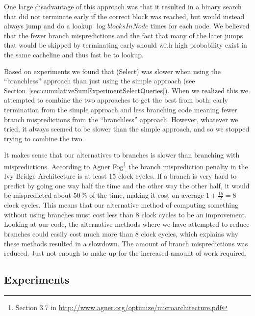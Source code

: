 One large disadvantage of this approach was that it resulted in a binary search that did not terminate early if the correct block was reached, but would instead always jump and do a lookup $\log \mathit{blocksInNode}$ times for each node.
We believed that the fewer branch mispredictions and the fact that many of the later jumps that would be skipped by terminating early should with high probability exist in the same cacheline and thus fast be to lookup.

Based on experiments we found that \textproc(Select) was slower when using the “branchless” approach than just using the simple approach (see Section~\ref{sec:cumulativeSumExperimentSelectQueries}).
When we realized this we attempted to combine the two approaches to get the best from both: early termination from the simple approach and less branching code meaning fewer branch mispredictions from the “branchless” approach.
However, whatever we tried, it always seemed to be slower than the simple approach, and so we stopped trying to combine the two.

It makes sense that our alternatives to branches is slower than branching with mispredictions.
According to Agner Fog\footnote{Section 3.7 in \url{http://www.agner.org/optimize/microarchitecture.pdf}} the branch misprediction penalty in the Ivy Bridge Architecture is at least 15 clock cycles.
If a branch is very hard to predict by going one way half the time and the other way the other half, it would be mispredicted about 50\,\% of the time, making it cost on average $1+\frac{15}{2}=8$ clock cycles.
This means that our alternative method of computing something without using branches must cost less than 8 clock cycles to be an improvement.
Looking at our code, the alternative methods where we have attempted to reduce branches could easily cost much more than 8 clock cycles, which explains why these methods resulted in a slowdown.
The amount of branch mispredictions was reduced. Just not enough to make up for the increased amount of work required.

\subsection{Experiments}

